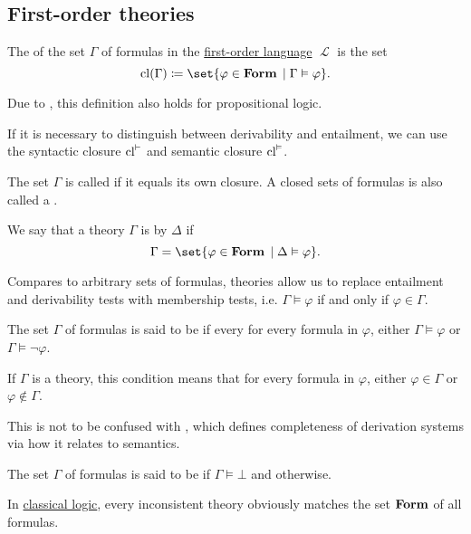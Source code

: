 \subsection{First-order theories}\label{subsec:first_order_theories}

\begin{definition}\label{def:first_order_theory}
  The  of the set \( \Gamma \) of formulas in the \hyperref[def:first_order_syntax]{first-order language} \( \mscrL \) is the set
  \begin{equation*}
    \cl(\Gamma) \coloneqq \set{ \varphi \in \boldop{Form} \given \Gamma \vDash \varphi }.
  \end{equation*}

  Due to , this definition also holds for propositional logic.

  If it is necessary to distinguish between derivability and entailment, we can use the syntactic closure \( \operatorname{cl}^\vdash \) and semantic closure \( \operatorname{cl}^\vDash \).

  The set \( \Gamma \) is called  if it equals its own closure. A closed sets of formulas is also called a .

  We say that a theory \( \Gamma \) is  by \( \Delta \) if
  \begin{equation*}
    \Gamma = \set{ \varphi \in \boldop{Form} \given \Delta \vDash \varphi }.
  \end{equation*}

  Compares to arbitrary sets of formulas, theories allow us to replace entailment and derivability tests with membership tests, i.e. \( \Gamma \vDash \varphi \) if and only if \( \varphi \in \Gamma \).

  \begin{thmenum}
     The set \( \Gamma \) of formulas is said to be  if every for every formula in \( \varphi \), either \( \Gamma \vDash \varphi \) or \( \Gamma \vDash \neg \varphi \).

    If \( \Gamma \) is a theory, this condition means that for every formula in \( \varphi \), either \( \varphi \in \Gamma \) or \( \varphi \not\in \Gamma \).

    This is not to be confused with , which defines completeness of derivation systems via how it relates to semantics.

     The set \( \Gamma \) of formulas is said to be  if \( \Gamma \vDash \bot \) and  otherwise.

    In \hyperref[def:classical_logic]{classical logic}, every inconsistent theory obviously matches the set \( \operatorname{\mathbf{Form}} \) of all formulas.
  \end{thmenum}
\end{definition}

